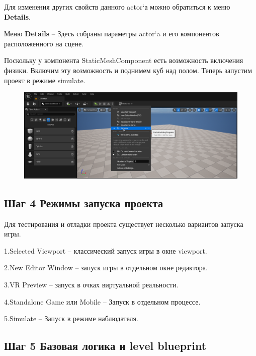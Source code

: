 Для изменения других свойств данного actor`а можно обратиться к меню \textbf{Details}.

Меню \textbf{Details} -- Здесь собраны параметры actor`a и его компонентов расположенного на сцене. 

Поскольку у компонента StaticMeshComponent есть возможность включения физики. Включим эту возможность и поднимем куб над полом. 
Теперь запустим проект в режиме simulate.

\begin{figure}[h]
    \centering
    \includegraphics*[width = \textwidth]{Lections/image.png}
\end{figure}

\subsection{Шаг 4 Режимы запуска проекта}



Для тестирования и отладки проекта существует несколько вариантов запуска игры.

1.\hspace{1em}Selected Viewport -- классический запуск игры в окне viewport.

2.\hspace{1em}New Editor Window -- запуск игры в отдельном окне редактора. 

3.\hspace{1em}VR Preview -- запуск в очках виртуальной реальности.

4.\hspace{1em}Standalone Game или Mobile -- Запуск в отдельном процессе.

5.\hspace{1em}Simulate -- Запуск в режиме наблюдателя.

\subsection{Шаг 5 Базовая логика и level blueprint}

